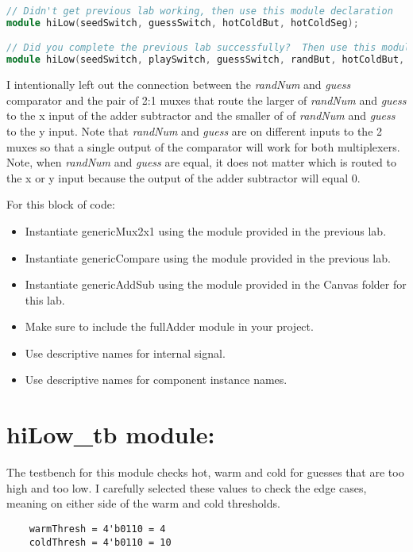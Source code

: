 \begin{lstlisting}[language=Verilog,
 caption={The module declaration for the enhanced hiLow module if you did or did 
 not get the previous lab working.},
 label={listing:hiLowModule},
 frame=single]
 // Didn't get previous lab working, then use this module declaration
module hiLow(seedSwitch, guessSwitch, hotColdBut, hotColdSeg);

// Did you complete the previous lab successfully?  Then use this module declaration.
module hiLow(seedSwitch, playSwitch, guessSwitch, randBut, hotColdBut, hiLowBut, randMsbSeg, randLsbSeg, greenLEDs, hotColdSeg, hiLowSeg);
 \end{lstlisting}
 
I intentionally left out the connection between the \emph{randNum} and
\emph{guess} comparator and the pair of 2:1 muxes that route the larger
of \emph{randNum} and \emph{guess} to the x input of the adder
subtractor and the smaller of of \emph{randNum} and \emph{guess} to the
y input. Note that \emph{randNum} and \emph{guess} are on different
inputs to the 2 muxes so that a single output of the comparator will
work for both multiplexers. Note, when \emph{randNum} and \emph{guess}
are equal, it does not matter which is routed to the x or y input
because the output of the adder subtractor will equal 0.

For this block of code:

\begin{itemize}
\item
  Instantiate genericMux2x1 using the module provided in the previous
  lab.
\item
  Instantiate genericCompare using the module provided in the previous
  lab.
\item
  Instantiate genericAddSub using the module provided in the Canvas
  folder for this lab.
\item
  Make sure to include the fullAdder module in your project.
\item
  Use descriptive names for internal signal.
\item
  Use descriptive names for component instance names.
\end{itemize}

\hypertarget{hilow_tb-module}{%
\section{hiLow\_tb module:}\label{hilow_tb-module}}

The testbench for this module checks hot, warm and cold for guesses that
are too high and too low. I carefully selected these values to check the
edge cases, meaning on either side of the warm and cold thresholds.
\begin{verbatim}
	warmThresh = 4'b0110 = 4
	coldThresh = 4'b0110 = 10
\end{verbatim}

